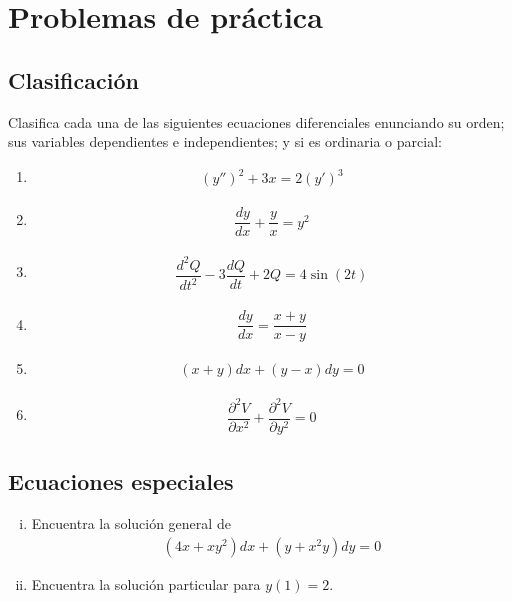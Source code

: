 \section{Problemas de práctica}

\subsection{Clasificación}


\begin{problema}
	Clasifica cada una de las siguientes ecuaciones diferenciales enunciando su orden; sus variables dependientes e independientes; y si es ordinaria o parcial:
	\begin{enumerate}
		\item
		\label{exmp 02_01}
		\begin{align*}
			\left(y''\right)^{2}+3x=2\left(y'\right)^3
		\end{align*}
		\item
		\label{exmp 02:02}
		\begin{align*}
			\dfrac{dy}{dx}+\dfrac{y}{x} = y^2
		\end{align*}
		\item
		\label{exmp 02:03}
		\begin{align*}
			\dfrac{d^{2}Q}{dt^{2}}-3\dfrac{dQ}{dt}+2Q = 4\sin(2t)
		\end{align*}
		\item
		\label{exmp 02:04}
		\begin{align*}
			\dfrac{dy}{dx}=\dfrac{x+y}{x-y}
		\end{align*}

		\item
		\begin{align*}
			(x+y)dx+(y-x)dy = 0
		\end{align*}
		\item
		\begin{align*}
			\dfrac{\partial^{2}V}{\partial x^{2}} +
			\dfrac{\partial^{2}V}{\partial y^{2}} = 0
		\end{align*}
	\end{enumerate}

\end{problema}

\subsection{Ecuaciones especiales}

\begin{problema}
	\begin{enumerate}[(i)]
		\item Encuentra la solución general de
		\begin{align*}
			\left( 4x+xy^{2} \right)dx+\left( y+x^{2}y \right)dy = 0
		\end{align*}

		\item Encuentra la solución particular para $y(1)=2$.
	\end{enumerate}
\end{problema}

